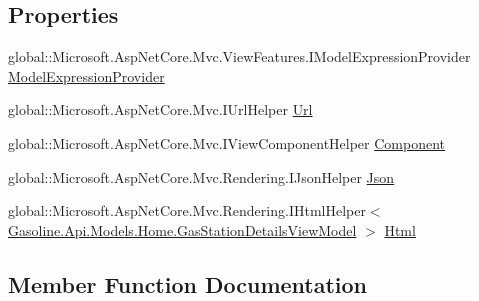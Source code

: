 \subsection*{Properties}
\begin{DoxyCompactItemize}
\item 
global\+::\+Microsoft.\+Asp\+Net\+Core.\+Mvc.\+View\+Features.\+I\+Model\+Expression\+Provider \mbox{\hyperlink{class_asp_net_core_1_1_views___home___gas_station_view_a6ce7e94f3e01c8ddb0b4cc10d8860be4}{Model\+Expression\+Provider}}
\item 
global\+::\+Microsoft.\+Asp\+Net\+Core.\+Mvc.\+I\+Url\+Helper \mbox{\hyperlink{class_asp_net_core_1_1_views___home___gas_station_view_ad31e597e7b708e1518ee0b9f37b7f20a}{Url}}
\item 
global\+::\+Microsoft.\+Asp\+Net\+Core.\+Mvc.\+I\+View\+Component\+Helper \mbox{\hyperlink{class_asp_net_core_1_1_views___home___gas_station_view_a74af5c72f03af3fd4458e2240af181b4}{Component}}
\item 
global\+::\+Microsoft.\+Asp\+Net\+Core.\+Mvc.\+Rendering.\+I\+Json\+Helper \mbox{\hyperlink{class_asp_net_core_1_1_views___home___gas_station_view_ae6fda9f7195a6d75fa0e12d608a8d921}{Json}}
\item 
global\+::\+Microsoft.\+Asp\+Net\+Core.\+Mvc.\+Rendering.\+I\+Html\+Helper$<$ \mbox{\hyperlink{class_gasoline_1_1_api_1_1_models_1_1_home_1_1_gas_station_details_view_model}{Gasoline.\+Api.\+Models.\+Home.\+Gas\+Station\+Details\+View\+Model}} $>$ \mbox{\hyperlink{class_asp_net_core_1_1_views___home___gas_station_view_a85d62e8171cc725e10d3a3aaeb034580}{Html}}
\end{DoxyCompactItemize}


\subsection{Member Function Documentation}
\mbox{\label{class_asp_net_core_1_1_views___home___gas_station_view_ae416524b32036b821169f08cbc7f6545}} 
